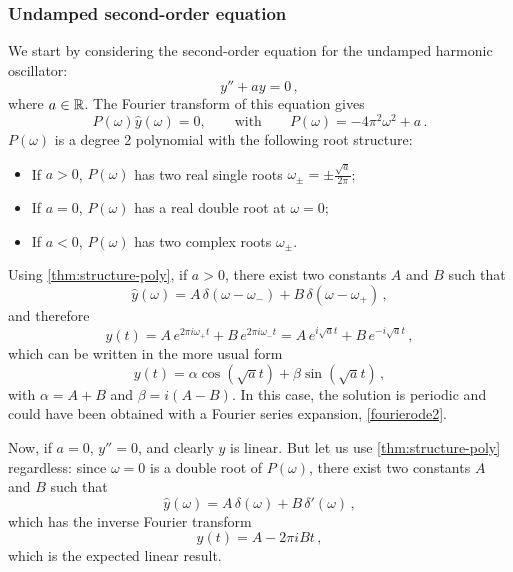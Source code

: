 \subsubsection{Undamped second-order equation}
We start by considering the second-order equation for the undamped harmonic oscillator:
\begin{equation}
  y''+ay=0\,,
\end{equation}
where $a\in\mathbb{R}$. The Fourier transform of this equation gives
\begin{equation}
  P(\omega)\hat{y}(\omega)=0,\qquad\text{with}\qquad P(\omega)=-4\pi^2\omega^2+a\,.
\end{equation}
$P(\omega)$ is a degree 2 polynomial with the following root structure:
\begin{itemize}
  \item If $a>0$, $P(\omega)$ has two real single roots
    $\omega_{\pm}=\pm\frac{\sqrt{a}}{2\pi}$;
  \item If $a=0$, $P(\omega)$ has a real double root at $\omega=0$;
  \item If $a<0$, $P(\omega)$ has two complex roots $\omega_{\pm}$.
\end{itemize}
Using \cref{thm:structure-poly}, if $a>0$, there exist two constants $A$ and $B$ such
that
\begin{equation}
  \hat{y}(\omega)=A\,\delta(\omega-\omega_-)+B\,\delta(\omega-\omega_+)\,,
\end{equation}
and therefore
\begin{equation}
  y(t)=A\,e^{2\pi i\omega_+t}+B\,e^{2\pi i\omega_-t}=A\,e^{i\sqrt{a}t}+B\,e^{-i\sqrt{a}t}\,,
  \label{eq:ode2-periodic}
\end{equation}
which can be written in the more usual form
\begin{equation}
  y(t)=\alpha\cos(\sqrt{a}t)+\beta\sin(\sqrt{a}t)\,,
\end{equation}
with $\alpha=A+B$ and $\beta=i(A-B)$. In this case, the solution is periodic and could
have been obtained with a Fourier series expansion, \cf\cref{fourierode2}.

Now, if $a=0$, $y''=0$, and clearly $y$ is linear. But let us use \cref{thm:structure-poly}
regardless: since $\omega=0$ is a double root of $P(\omega)$, there exist two constants
$A$ and $B$ such that
\begin{equation}
  \hat{y}(\omega)=A\,\delta(\omega)+B\,\delta'(\omega)\,,
\end{equation}
which has the inverse Fourier transform
\begin{equation}
  y(t)=A-2\pi i Bt\,,
\end{equation}
which is the expected linear result.

